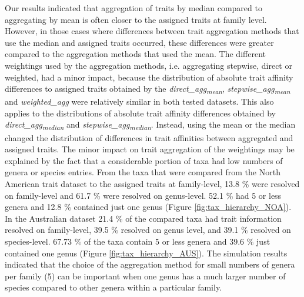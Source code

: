 \documentclass{article}
\begin{document}
Our results indicated that aggregation of traits by median compared to aggregating by mean is often closer to the assigned traits at family level. 
However, in those cases where differences between trait aggregation methods that use the median and assigned traits occurred, these differences were greater compared to the aggregation methods that used the mean. The different weightings used by the aggregation methods, i.e. aggregating stepwise, direct or weighted, had a minor impact, 
because the distribution of absolute trait affinity differences to assigned traits obtained by the \textit{direct\_agg\textsubscript{mean}}, \textit{stepwise\_agg\textsubscript{mean}} and \textit{weighted\_agg} were relatively similar in both tested datasets. This also applies to the distributions of absolute trait affinity differences obtained by \textit{direct\_agg\textsubscript{median}} and \textit{stepwise\_agg\textsubscript{median}}.
Instead, using the mean or the median changed the distribution of differences in trait affinities between aggregated and assigned traits. The minor impact on trait aggregation of the weightings may be explained by the fact that a considerable portion of taxa had low numbers of genera or species entries. %
From the taxa that were compared from the North American trait dataset to the assigned traits at family-level, 13.8 \% were resolved on family-level and 61.7 \% were resolved on genus-level. 52.1 \% had 5 or less genera and 12.8 \% contained just one genus (Figure \ref{fig:tax_hierarchy_NOA}). 
In the Australian dataset 21.4 \% of the compared taxa had trait information resolved on family-level, 39.5 \% resolved on genus level, and 39.1 \% resolved on species-level. 67.73 \% of the taxa contain 5 or less genera and 39.6 \% just contained one genus (Figure \ref{fig:tax_hierarchy_AUS}). The simulation results indicated that the choice of the aggregation method for small numbers of genera per family (5) can be important when one genus has a much larger number of species compared to other genera within a particular family. 
\end{document}
